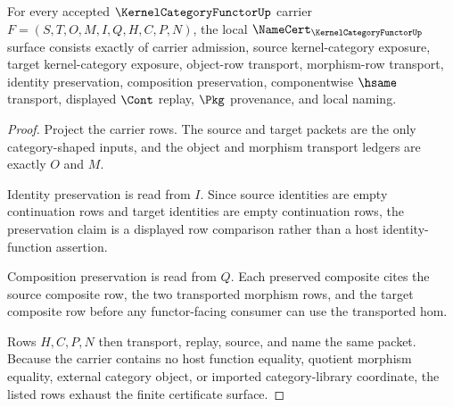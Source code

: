 \begin{theorem}
\label{thm:kernel-category-functor-transport-obligations}
For every accepted $\KernelCategoryFunctorUp$ carrier $F=(S,T,O,M,I,Q,H,C,P,N)$, the local $\NameCert_{\KernelCategoryFunctorUp}$ surface consists exactly of carrier admission, source kernel-category exposure, target kernel-category exposure, object-row transport, morphism-row transport, identity preservation, composition preservation, componentwise $\hsame$ transport, displayed $\Cont$ replay, $\Pkg$ provenance, and local naming.
\end{theorem}
\begin{proof}
Project the carrier rows. The source and target packets are the only category-shaped inputs, and the object and morphism transport ledgers are exactly $O$ and $M$.

Identity preservation is read from $I$. Since source identities are empty continuation rows and target identities are empty continuation rows, the preservation claim is a displayed row comparison rather than a host identity-function assertion.

Composition preservation is read from $Q$. Each preserved composite cites the source composite row, the two transported morphism rows, and the target composite row before any functor-facing consumer can use the transported hom.

Rows $H,C,P,N$ then transport, replay, source, and name the same packet. Because the carrier contains no host function equality, quotient morphism equality, external category object, or imported category-library coordinate, the listed rows exhaust the finite certificate surface.
\end{proof}

